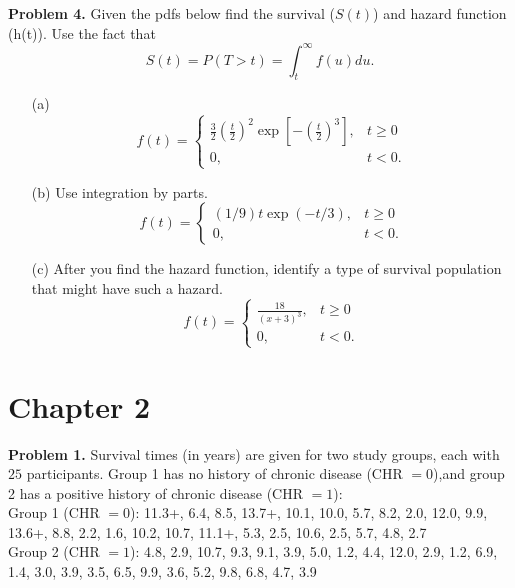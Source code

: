 \documentclass[12pt]{article}
\begin{document}
\textbf{Problem 4.}
Given the pdfs below find the survival ($S(t)$) and hazard function (h(t)). Use the fact that
\[
S(t) = P(T>t) = \int_t^{\infty} f(u) du. 
\] 

\begin{itemize}
	\item[(a)]
	$$
	f(t) = \begin{cases} \frac{3}{2} (\frac{t}{2})^2 \exp[-(\frac{t}{2})^3], &t\geq 0 \\
		0, &t < 0. 
		\end{cases}
	$$ 
	\item[(b)] Use integration by parts. 
	$$
	f(t) = \begin{cases} (1/9)t\exp(-t/3), &t\geq 0 \\
		0, &t < 0.
		\end{cases}
    $$
    \item[(c)] After you find the hazard function, identify a type of survival population that might have such a hazard. 
    $$
	f(t) = \begin{cases} \frac{18}{(x+3)^3}, &t\geq 0 \\
		0, &t < 0.
		\end{cases}
    $$
\end{itemize}


\clearpage


\section{Chapter 2}


\textbf{Problem 1.}
Survival times (in years) are given for two study groups, each with $25$ participants. Group 1 has no history of chronic disease (CHR $= 0$),and group 2 has a positive history of chronic disease (CHR $= 1$): \\

Group 1 (CHR $= 0$): 11.3+, 6.4, 8.5, 13.7+, 10.1, 10.0, 5.7, 8.2, 2.0, 12.0, 9.9, 13.6+, 8.8, 2.2, 1.6, 10.2, 10.7, 11.1+, 5.3, 2.5, 10.6, 2.5, 5.7, 4.8, 2.7 \\

Group 2 (CHR $= 1$): 4.8, 2.9, 10.7, 9.3, 9.1, 3.9, 5.0, 1.2, 4.4, 12.0, 2.9, 1.2, 6.9, 1.4, 3.0, 3.9, 3.5, 6.5, 9.9, 3.6, 5.2, 9.8, 6.8, 4.7, 3.9 \\
\end{document}
